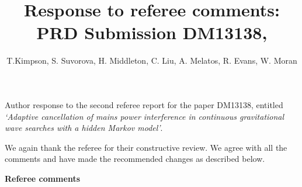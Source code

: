 \documentclass[10pt]{article}
\author{T.Kimpson, S. Suvorova, H. Middleton, C. Liu, A. Melatos, R. Evans, W. Moran}
\title{Response to referee comments: \\ PRD Submission DM13138,}
\begin{document}
	\maketitle
\noindent Author response to the second referee report for the paper DM13138,
entitled \textit{`Adaptive cancellation of mains power interference in continuous gravitational wave searches with a hidden Markov model'}. \newline 

\noindent We again thank the referee for their constructive review.
We agree with all the comments and have made the recommended changes as described below. \newline 



\newpage
\noindent \Large \textbf{Referee comments} \normalsize

\vspace{5mm}
\end{document}
